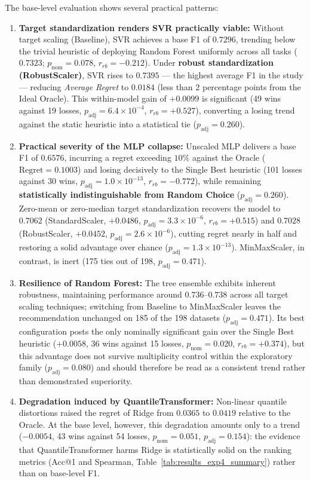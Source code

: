 \documentclass[12pt]{article}
\begin{document}
The base-level evaluation shows several practical patterns:

\begin{enumerate}
  \item \textbf{Target standardization renders SVR practically viable:} Without target scaling (Baseline), SVR achieves a base F1 of $0.7296$, trending below the trivial heuristic of deploying Random Forest uniformly across all tasks ($0.7323$; $p_{\text{nom}} = 0.078$, $r_{rb} = -0.212$). Under \textbf{robust standardization (RobustScaler)}, SVR rises to \textbf{$0.7395$} --- the highest average F1 in the study --- reducing \textit{Average Regret} to $0.0184$ (less than 2 percentage points from the Ideal Oracle). This within-model gain of $+0.0099$ is significant (49 wins against 19 losses, $p_{\text{adj}} = 6.4 \times 10^{-4}$, $r_{rb} = +0.527$), converting a losing trend against the static heuristic into a statistical tie ($p_{\text{adj}} = 0.260$).
  \item \textbf{Practical severity of the MLP collapse:} Unscaled MLP delivers a base F1 of $0.6576$, incurring a regret exceeding $10\%$ against the Oracle ($\text{Regret} = 0.1003$) and losing decisively to the Single Best heuristic (101 losses against 30 wins, $p_{\text{adj}} = 1.0 \times 10^{-13}$, $r_{rb} = -0.772$), while remaining \textbf{statistically indistinguishable from Random Choice} ($p_{\text{adj}} = 0.260$). Zero-mean or zero-median target standardization recovers the model to $0.7062$ (StandardScaler, $+0.0486$, $p_{\text{adj}} = 3.3 \times 10^{-6}$, $r_{rb} = +0.515$) and $0.7028$ (RobustScaler, $+0.0452$, $p_{\text{adj}} = 2.6 \times 10^{-6}$), cutting regret nearly in half and restoring a solid advantage over chance ($p_{\text{adj}} = 1.3 \times 10^{-13}$). MinMaxScaler, in contrast, is inert (175 ties out of 198, $p_{\text{adj}} = 0.471$).
  \item \textbf{Resilience of Random Forest:} The tree ensemble exhibits inherent robustness, maintaining performance around $0.736$--$0.738$ across all target scaling techniques; switching from Baseline to MinMaxScaler leaves the recommendation unchanged on 185 of the 198 datasets ($p_{\text{adj}} = 0.471$). Its best configuration posts the only nominally significant gain over the Single Best heuristic ($+0.0058$, 36 wins against 15 losses, $p_{\text{nom}} = 0.020$, $r_{rb} = +0.374$), but this advantage does not survive multiplicity control within the exploratory family ($p_{\text{adj}} = 0.080$) and should therefore be read as a consistent trend rather than demonstrated superiority.
  \item \textbf{Degradation induced by QuantileTransformer:} Non-linear quantile distortions raised the regret of Ridge from $0.0365$ to $0.0419$ relative to the Oracle. At the base level, however, this degradation amounts only to a trend ($-0.0054$, 43 wins against 54 losses, $p_{\text{nom}} = 0.051$, $p_{\text{adj}} = 0.154$): the evidence that QuantileTransformer harms Ridge is statistically solid on the ranking metrics (Acc@1 and Spearman, Table~\ref{tab:results_exp4_summary}) rather than on base-level F1.
\end{enumerate}
\end{document}
